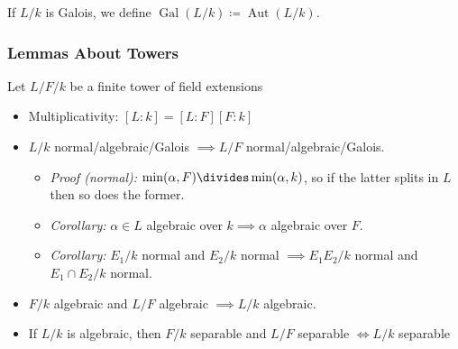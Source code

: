 \begin{definition}

If \(L/k\) is Galois, we define
\(\operatorname{Gal}(L/k) \coloneqq{\operatorname{Aut}}(L/k)\).

\end{definition}

\hypertarget{lemmas-about-towers}{%
\subsubsection{Lemmas About Towers}\label{lemmas-about-towers}}

Let \(L/F/k\) be a finite tower of field extensions

\begin{itemize}
\item
  Multiplicativity: \([L : k] = [L: F][F: k]\)
\item
  \(L/k\) normal/algebraic/Galois \(\implies L/F\)
  normal/algebraic/Galois.

  \begin{itemize}
  \tightlist
  \item
    \emph{Proof (normal):} \(\min(\alpha, F) \divides \min(\alpha, k)\),
    so if the latter splits in \(L\) then so does the former.
  \item
    \emph{Corollary:} \(\alpha \in L\) algebraic over
    \(k \implies \alpha\) algebraic over \(F\).
  \item
    \emph{Corollary:} \(E_1/k\) normal and \(E_2/k\) normal
    \(\implies E_1E_2/k\) normal and \(E_1 \cap E_2 / k\) normal.
  \end{itemize}
\end{itemize}

\begin{center}
\end{center}

\begin{itemize}
\item
  \(F/k\) algebraic and \(L/F\) algebraic \(\implies L/k\) algebraic.
\item
  If \(L/k\) is algebraic, then \(F/k\) separable and \(L/F\) separable
  \(\iff L/k\) separable
\end{itemize}

